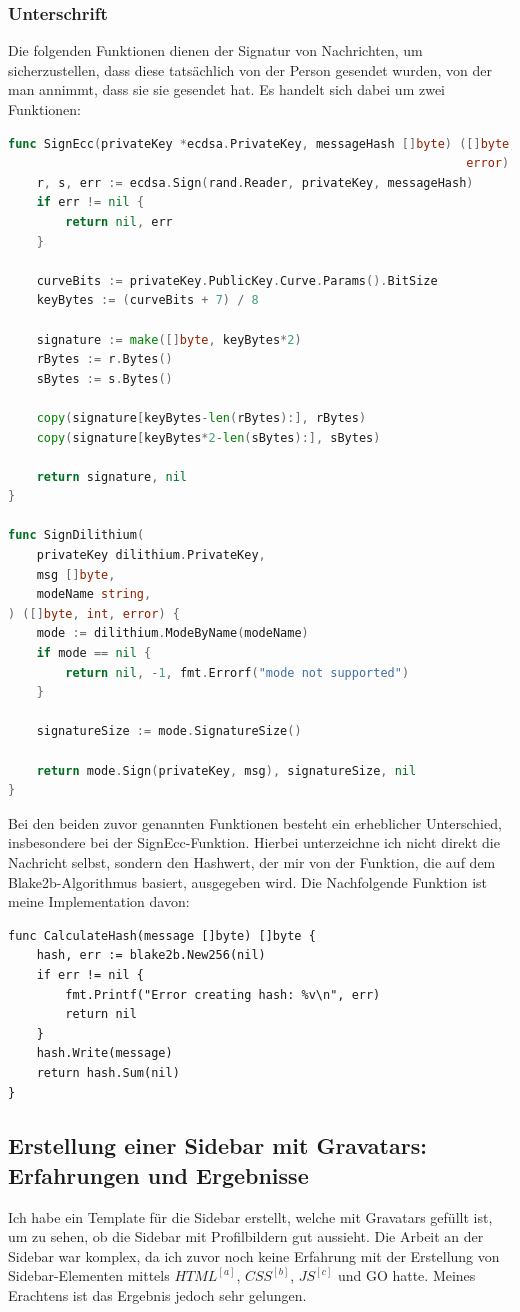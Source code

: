 \subsubsection{Unterschrift}
Die folgenden Funktionen dienen der Signatur von Nachrichten, um sicherzustellen, dass diese tatsächlich von der Person gesendet wurden, von der man annimmt, dass sie sie gesendet hat. Es handelt sich dabei um zwei Funktionen:
\begin{lstlisting}[language=Go]
func SignEcc(privateKey *ecdsa.PrivateKey, messageHash []byte) ([]byte,
                                                                error) {
	r, s, err := ecdsa.Sign(rand.Reader, privateKey, messageHash)
	if err != nil {
		return nil, err
	}

	curveBits := privateKey.PublicKey.Curve.Params().BitSize
	keyBytes := (curveBits + 7) / 8

	signature := make([]byte, keyBytes*2)
	rBytes := r.Bytes()
	sBytes := s.Bytes()

	copy(signature[keyBytes-len(rBytes):], rBytes)
	copy(signature[keyBytes*2-len(sBytes):], sBytes)

	return signature, nil
}

func SignDilithium(
	privateKey dilithium.PrivateKey,
	msg []byte,
	modeName string,
) ([]byte, int, error) {
	mode := dilithium.ModeByName(modeName)
	if mode == nil {
		return nil, -1, fmt.Errorf("mode not supported")
	}

	signatureSize := mode.SignatureSize()

	return mode.Sign(privateKey, msg), signatureSize, nil
}
\end{lstlisting}
Bei den beiden zuvor genannten Funktionen besteht ein erheblicher Unterschied, insbesondere bei der SignEcc-Funktion. Hierbei unterzeichne ich nicht direkt die Nachricht selbst, sondern den Hashwert, der mir von der Funktion, die auf dem Blake2b-Algorithmus basiert, ausgegeben wird. Die Nachfolgende Funktion ist meine Implementation davon:
\begin{lstlisting}
func CalculateHash(message []byte) []byte {
	hash, err := blake2b.New256(nil)
	if err != nil {
		fmt.Printf("Error creating hash: %v\n", err)  
		return nil
	}
	hash.Write(message)
	return hash.Sum(nil)
}
\end{lstlisting}
\subsection{Erstellung einer Sidebar mit Gravatars: Erfahrungen und Ergebnisse}
Ich habe ein Template für die Sidebar erstellt, welche mit Gravatars gefüllt ist, um zu sehen, ob die Sidebar mit Profilbildern gut aussieht. Die Arbeit an der Sidebar war komplex, da ich zuvor noch keine Erfahrung mit der Erstellung von Sidebar-Elementen mittels \hyperref[glo:html1]{\(HTML^{[a]}\)}, \hyperref[glo:css]{\(CSS^{[b]}\)}, \hyperref[glo:js]{\(JS^{[c]}\)} und GO hatte. Meines Erachtens ist das Ergebnis jedoch sehr gelungen.
